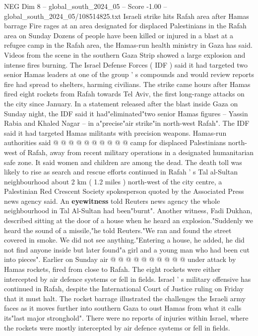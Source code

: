 \begin{textsample}{NEG Dim 8 – global\_south\_2024\_05 – Score -1.00 – global\_south\_2024\_05/108514825.txt}  \label{ex:f8_neg_231}
Israeli strike hits Rafah area after Hamas barrage Fire rages at an area designated for displaced Palestinians in the Rafah area on Sunday Dozens of people have been killed or injured in a blast at a refugee camp in the Rafah area, the Hamas-run health ministry in Gaza has said.
Videos from the scene in the southern Gaza Strip showed a large explosion and intense fires burning.
The Israel Defense Forces ( IDF ) said it had targeted two senior Hamas leaders at one of the group ' s compounds and would review reports fire had spread to shelters, harming civilians.
The strike came hours after Hamas fired eight rockets from Rafah towards Tel Aviv, the first long-range attacks on the city since January.
In a statement released after the blast inside Gaza on Sunday night, the IDF said it had"eliminated"two senior Hamas figures -- Yassin Rabia and Khaled Nagar -- in a"precise"air strike"in north-west Rafah".
The IDF said it had targeted Hamas militants with precision weapons.
Hamas-run authorities said @ @ @ @ @ @ @ @ @ @ camp for displaced Palestinians north-west of Rafah, away from recent military operations in a designated humanitarian safe zone.
It said women and children are among the dead.
The death toll was likely to rise as search and rescue efforts continued in Rafah ' s Tal al-Sultan neighbourhood about 2 km ( 1.2 miles ) north-west of the city centre, a Palestinian Red Crescent Society spokesperson quoted by the Associated Press news agency said.
An \textbf{eyewitness} told Reuters news agency the whole neighbourhood in Tal Al-Sultan had been"burnt".
Another witness, Fadi Dukhan, described sitting at the door of a house when he heard an explosion."Suddenly we heard the sound of a missile,"he told Reuters."We ran and found the street covered in smoke.
We did not see anything."Entering a house, he added, he did not find anyone inside but later found"a girl and a young man who had been cut into pieces".
Earlier on Sunday air @ @ @ @ @ @ @ @ @ @ under attack by Hamas rockets, fired from close to Rafah.
The eight rockets were either intercepted by air defence systems or fell in fields.
Israel ' s military offensive has continued in Rafah, despite the International Court of Justice ruling on Friday that it must halt.
The rocket barrage illustrated the challenges the Israeli army faces as it moves further into southern Gaza to oust Hamas from what it calls its"last major stronghold".
There were no reports of injuries within Israel, where the rockets were mostly intercepted by air defence systems or fell in fields.

\end{textsample}
